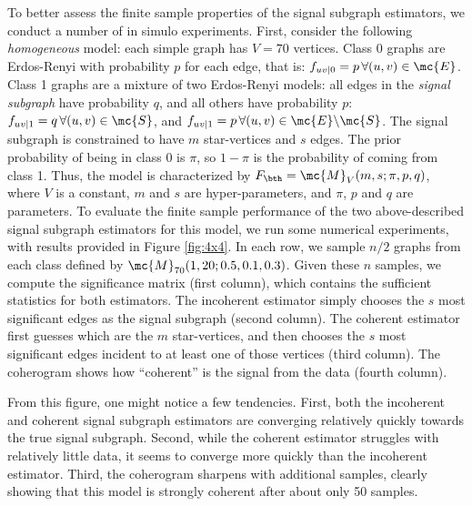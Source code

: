 \documentclass[10pt,journal,cspaper,compsoc]{IEEEtran}
\begin{document}
To better assess the finite sample properties of the signal subgraph estimators, we conduct a number of in simulo experiments.  First, consider the following \emph{homogeneous} model: each simple graph has $V=70$ vertices.  Class 0 graphs are Erdos-Renyi with probability $p$ for each edge, that is: $f_{uv|0}=p \, \forall (u,v) \in \mc{E}$.  Class 1 graphs are a mixture of two Erdos-Renyi models: all edges in the \emph{signal subgraph} have probability $q$, and all others have probability $p$: $f_{uv|1}=q \, \forall (u,v) \in \mc{S}$, and $f_{uv|1}=p \, \forall (u,v) \in \mc{E} \backslash \mc{S}$.  The signal subgraph is constrained to have $m$ star-vertices and $s$ edges.  The prior probability of being in class 0 is $\pi$, so $1-\pi$ is the probability of coming from class 1. Thus, the model is characterized by $F_{\bth}=\mc{M}_V(m,s; \pi,p,q)$, where $V$ is a constant, $m$ and $s$ are hyper-parameters, and $\pi$, $p$ and $q$ are parameters.  To evaluate the finite sample performance of the two above-described signal subgraph estimators for this model, we run some numerical experiments, with results provided in Figure \ref{fig:4x4}.  In each row, we sample $n/2$ graphs from each class defined by $\mc{M}_{70}(1,20;0.5,0.1,0.3)$.  Given these $n$ samples, we compute the significance matrix (first column), which contains the sufficient statistics for both estimators.  The incoherent estimator simply chooses the $s$ most significant edges as the signal subgraph (second column). The coherent estimator first guesses which are  the $m$ star-vertices, and then chooses the $s$ most significant edges incident to at least one of those vertices (third column).  The coherogram shows how ``coherent'' is the signal from the data (fourth column).    

From this figure, one might notice a few tendencies.  First, both the incoherent and coherent signal subgraph estimators are converging relatively quickly towards the true signal subgraph.  Second, while the coherent estimator struggles with relatively little data, it seems to converge more quickly than the incoherent estimator.  Third, the coherogram sharpens with additional samples, clearly showing that this model is strongly coherent after about only 50 samples.
\end{document}

